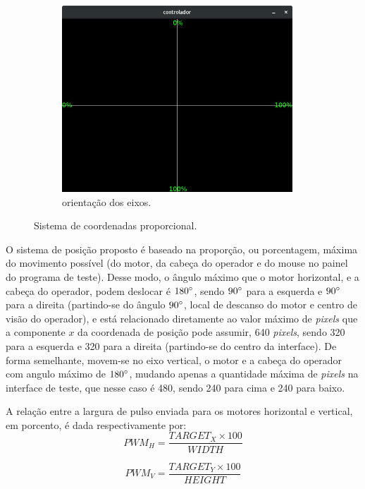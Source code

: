 \begin{figure}[H]
\begin{subfigure}{.5\textwidth}
		\includegraphics[width=0.95\textwidth]{figuras/controlador-values.jpg}
		\caption{orientação dos eixos.}
		\label{fig:sistcoord}
	\end{subfigure}
	\caption{Sistema de coordenadas proporcional.}
\end{figure}

O sistema de posição proposto é baseado na proporção, ou porcentagem, máxima do movimento possível (do motor, da cabeça do operador e do mouse no painel do programa de teste). Desse modo, o ângulo máximo que o motor horizontal, e a cabeça do operador, podem deslocar é $180\degree$, sendo $90\degree$ para a esquerda e $90\degree$ para a direita (partindo-se do ângulo $90\degree$, local de descanso do motor e centro de visão do operador), e está relacionado diretamente ao valor máximo de \textit{pixels} que a componente $x$ da coordenada de posição pode assumir, 640 \textit{pixels}, sendo 320 para a esquerda e 320 para a direita (partindo-se do centro da interface). De forma semelhante, movem-se no eixo vertical, o motor e a cabeça do operador com angulo máximo de $180\degree$, mudando apenas a quantidade máxima de \textit{pixels} na interface de teste, que nesse caso é 480, sendo 240 para cima e 240 para baixo.\par
A relação entre a largura de pulso enviada para os motores horizontal e vertical, em porcento, é dada respectivamente por:
\begin{equation}
	PWM_H = \frac{TARGET_X \times 100}{WIDTH}
	\label{eq:pwm_screen_h}
\end{equation}

\begin{equation}
	PWM_V = \frac{TARGET_Y \times 100}{HEIGHT}
	\label{eq:pwm_screen_v}
\end{equation}

